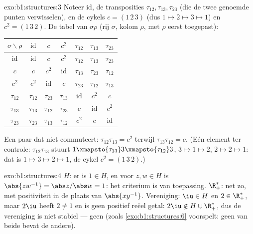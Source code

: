 \begin{solution}{exo:b1:structures:3}
Noteer $\mathrm{id}$, de transposities $\tau_{12}, \tau_{13}, \tau_{23}$
(die de twee genoemde punten verwisselen), en de cykels $c = (1\,2\,3)$
(dus $1 \mapsto 2 \mapsto 3 \mapsto 1$) en $c^2 = (1\,3\,2)$. De tabel van
$\sigma\rho$ (rij $\sigma$, kolom $\rho$, met $\rho$ eerst toegepast):
\begin{center}
\renewcommand{\arraystretch}{1.2}
\begin{tabular}{c|cccccc}
$\sigma\backslash\rho$ & $\mathrm{id}$ & $c$ & $c^2$ & $\tau_{12}$ &
$\tau_{13}$ & $\tau_{23}$ \\
\hline
$\mathrm{id}$ & $\mathrm{id}$ & $c$ & $c^2$ & $\tau_{12}$ &
$\tau_{13}$ & $\tau_{23}$ \\
$c$ & $c$ & $c^2$ & $\mathrm{id}$ & $\tau_{13}$ & $\tau_{23}$ &
$\tau_{12}$ \\
$c^2$ & $c^2$ & $\mathrm{id}$ & $c$ & $\tau_{23}$ & $\tau_{12}$ &
$\tau_{13}$ \\
$\tau_{12}$ & $\tau_{12}$ & $\tau_{23}$ & $\tau_{13}$ & $\mathrm{id}$
& $c^2$ & $c$ \\
$\tau_{13}$ & $\tau_{13}$ & $\tau_{12}$ & $\tau_{23}$ & $c$ &
$\mathrm{id}$ & $c^2$ \\
$\tau_{23}$ & $\tau_{23}$ & $\tau_{13}$ & $\tau_{12}$ & $c^2$ & $c$ &
$\mathrm{id}$ \\
\end{tabular}
\end{center}
Een paar dat niet commuteert: $\tau_{12}\tau_{13} = c^2$ terwijl
$\tau_{13}\tau_{12} = c$. (Eén element ter controle:
$\tau_{12}\tau_{13}$ stuurt $1 \xmapsto{\tau_{13}} 3 \xmapsto{\tau_{12}}
3$, $3 \mapsto 1 \mapsto 2$, $2 \mapsto 2 \mapsto 1$: dat is $1 \mapsto 3
\mapsto 2 \mapsto 1$, de cykel $c^2 = (1\,3\,2)$.)
\end{solution}

\begin{solution}{exo:b1:structures:4}
$H$: er is $1 \in H$, en voor $z, w \in H$ is $\abs{zw^{-1}} = \abs z /
\abs w = 1$: het criterium is van toepassing. $\R_+^*$: net zo, met
positiviteit in de plaats van $\abs{xy^{-1}}$. Vereniging: $\iu \in H$ en
$2 \in \R_+^*$, maar $2\iu$ heeft  $2 \neq 1$ en is geen positief
reëel getal: $2\iu \notin H \cup \R_+^*$, dus de vereniging is niet
stabiel --- geen  (zoals \cref{exo:b1:structures:6} voorspelt:
geen van beide  bevat de andere).
\end{solution}

